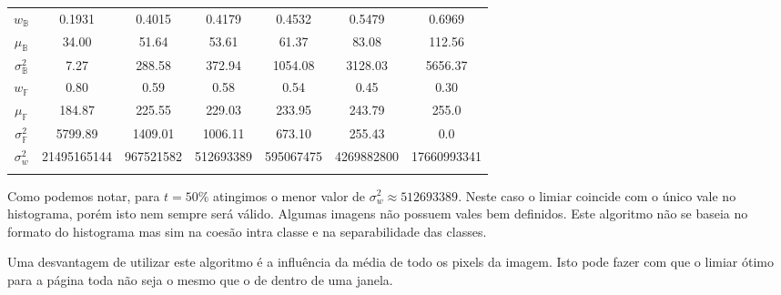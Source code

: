 \documentclass[a4paper,11pt]{article}
\begin{document}
\begin{center}
\begin{table}
\begin{tabular}[p]{@{}ccccccc@{}}
        \\
        $w_\mathbb{B}$ & 0.1931 & 0.4015 & 0.4179 & 0.4532 & 0.5479 & 0.6969 \\

        $\mu_\mathbb{B}$ & 34.00 & 51.64 & 53.61 & 61.37 & 83.08 & 112.56 \\

        $\sigma^{2}_{\mathbb{B}}$ & 7.27 & 288.58 & 372.94 & 1054.08 & 3128.03 & 5656.37 \\

        $w_{\mathbb{F}}$ & 0.80 & 0.59 & 0.58 & 0.54 & 0.45 & 0.30 \\

        $\mu_{\mathbb{F}}$ & 184.87 & 225.55 & 229.03 & 233.95 & 243.79 & 255.0 \\

        $\sigma^{2}_{\mathbb{F}}$ & 5799.89 & 1409.01 & 1006.11 & 673.10 & 255.43 & 0.0 \\

        $\sigma^{2}_{w}$ & 21495165144 & 967521582 & 512693389 & 595067475 & 4269882800 & 17660993341 \\

        \label{tab:otsu}
      \end{tabular}
    \end{table}
    \end{center}

    Como podemos notar, para $t = 50\%$ atingimos o menor valor de $\sigma^{2}_{w} \approx 512693389$. Neste caso o limiar coincide com o único vale no histograma, porém isto nem sempre será válido. Algumas imagens não possuem vales bem definidos. Este algoritmo não se baseia no formato do histograma mas sim na coesão intra classe e na separabilidade das classes.

    Uma desvantagem de utilizar este algoritmo é a influência da média de todo os pixels da imagem. Isto pode fazer com que o limiar ótimo para a página toda não seja o mesmo que o de dentro de uma janela.

\end{document}
